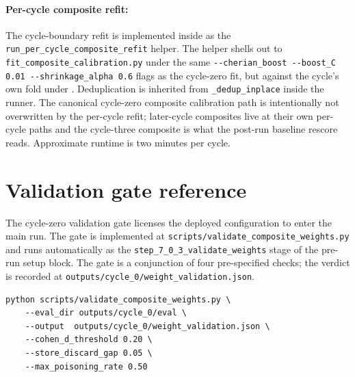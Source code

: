 \paragraph{Per-cycle composite refit:} The cycle-boundary refit is implemented inside  as the \verb|run_per_cycle_composite_refit| helper. The helper shells out to \verb|fit_composite_calibration.py| under the same \verb|--cherian_boost --boost_C 0.01 --shrinkage_alpha 0.6| flags as the cycle-zero fit, but against the cycle's own fold under . Deduplication is inherited from \verb|_dedup_inplace| inside the runner. The canonical cycle-zero composite calibration path is intentionally not overwritten by the per-cycle refit; later-cycle composites live at their own per-cycle paths and the cycle-three composite is what the post-run baseline rescore reads. Approximate runtime is two minutes per cycle.

\section{Validation gate reference}
\label{app:gate-reference}

The cycle-zero validation gate licenses the deployed configuration to enter the main run. The gate is implemented at \verb|scripts/validate_composite_weights.py| and runs automatically as the \verb|step_7_0_3_validate_weights| stage of the pre-run setup block. The gate is a conjunction of four pre-specified checks; the verdict is recorded at \verb|outputs/cycle_0/weight_validation.json|.

\begin{verbatim}
python scripts/validate_composite_weights.py \
    --eval_dir outputs/cycle_0/eval \
    --output  outputs/cycle_0/weight_validation.json \
    --cohen_d_threshold 0.20 \
    --store_discard_gap 0.05 \
    --max_poisoning_rate 0.50
\end{verbatim}

